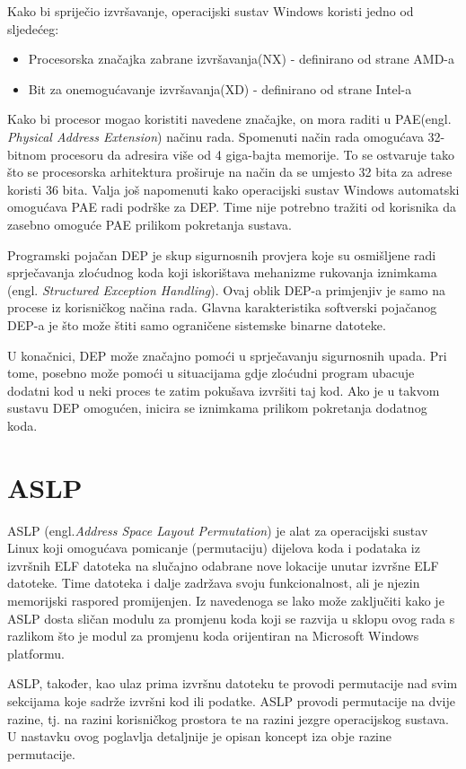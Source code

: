 \documentclass[times, utf8, diplomski, numeric]{fer}
\begin{document}
Kako bi spriječio izvršavanje, operacijski sustav Windows koristi jedno od sljedećeg:
\begin{itemize}
\item Procesorska značajka zabrane izvršavanja(NX) - definirano od strane AMD-a
\item Bit za onemogućavanje izvršavanja(XD) - definirano od strane Intel-a
\end{itemize}
Kako bi procesor mogao koristiti navedene značajke, on mora raditi u PAE(engl. \emph{Physical Address Extension})\citep{pae_ms} načinu rada. Spomenuti način rada omogućava 32-bitnom procesoru da adresira više od 4 giga-bajta memorije. To se ostvaruje tako što se procesorska arhitektura proširuje na način da se umjesto 32 bita za adrese koristi 36 bita. Valja još napomenuti kako operacijski sustav Windows automatski omogućava PAE radi podrške za DEP. Time nije potrebno tražiti od korisnika da zasebno omoguće PAE prilikom pokretanja sustava.

Programski pojačan DEP je skup sigurnosnih provjera koje su osmišljene radi sprječavanja zloćudnog koda koji iskorištava mehanizme rukovanja iznimkama (engl. \emph{Structured Exception Handling}). Ovaj oblik DEP-a primjenjiv je samo na procese iz korisničkog načina rada. Glavna karakteristika softverski pojačanog DEP-a je što može štiti samo ograničene sistemske binarne datoteke.

U konačnici, DEP može značajno pomoći u sprječavanju sigurnosnih upada. Pri tome, posebno može pomoći u situacijama gdje zloćudni program ubacuje dodatni kod u neki proces te zatim pokušava izvršiti taj kod. Ako je u takvom sustavu DEP omogućen, inicira se iznimkama prilikom pokretanja dodatnog koda.

\section{ASLP}
\label{sct:aslp}
ASLP\citep{aslp} (engl.\emph{Address Space Layout Permutation}) je alat za operacijski sustav Linux koji omogućava pomicanje (permutaciju) dijelova koda i podataka iz izvršnih ELF datoteka na slučajno odabrane nove lokacije unutar izvršne ELF datoteke. Time datoteka i dalje zadržava svoju funkcionalnost, ali je njezin memorijski raspored promijenjen. Iz navedenoga se lako može zaključiti kako je ASLP dosta sličan modulu za promjenu koda koji se razvija u sklopu ovog rada s razlikom što je modul za promjenu koda orijentiran na Microsoft Windows platformu. 

ASLP, također, kao ulaz prima izvršnu datoteku te provodi permutacije nad svim sekcijama koje sadrže izvršni kod ili podatke. ASLP provodi permutacije na dvije razine, tj. na razini korisničkog prostora te na razini jezgre operacijskog sustava. U nastavku ovog poglavlja detaljnije je opisan koncept iza obje razine permutacije.
\end{document}
